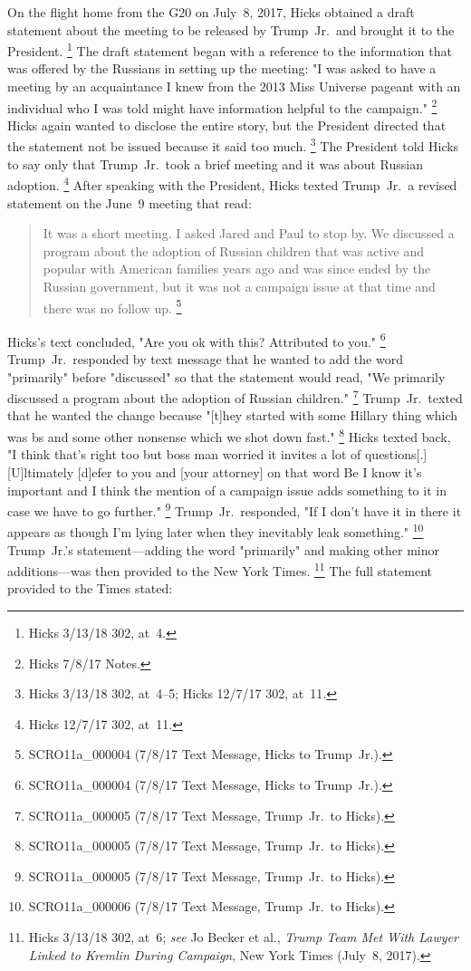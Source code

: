 On the flight home from the G20 on July~8, 2017, Hicks obtained a draft statement about the meeting to be released by Trump~Jr.\ and brought it to the President.%
\footnote{Hicks 3/13/18 302, at~4.}
The draft statement began with a reference to the information that was offered by the Russians in setting up the meeting: "I was asked to have a meeting by an acquaintance I knew from the 2013 Miss Universe pageant with an individual who I was told might have information helpful to the campaign."%
\footnote{Hicks 7/8/17 Notes.}
Hicks again wanted to disclose the entire story, but the President directed that the statement not be
issued because it said too much.%
\footnote{Hicks 3/13/18 302, at~4--5;
Hicks 12/7/17 302, at~11.}
The President told Hicks to say only that Trump~Jr.\ took a brief meeting and it was about Russian adoption.%
\footnote{Hicks 12/7/17 302, at~11.}
After speaking with the President, Hicks texted Trump~Jr.\ a revised statement on the June~9 meeting that read:

\begin{quote}
It was a short meeting.
I asked Jared and Paul to stop by.
We discussed a program about the adoption of Russian children that was active and popular with American families years ago and was since ended by the Russian government, but it was not a campaign issue at that time and there was no follow up.%
\footnote{SCRO11a\_000004 (7/8/17 Text Message, Hicks to Trump~Jr.).}
\end{quote}

Hicks's text concluded, "Are you ok with this? Attributed to you."%
\footnote{SCRO11a\_000004 (7/8/17 Text Message, Hicks to Trump~Jr.).}
Trump~Jr.\ responded by text message that he wanted to add the word "primarily" before "discussed" so that the statement would read, "We primarily discussed a program about the adoption of Russian children."%
\footnote{SCRO11a\_000005 (7/8/17 Text Message, Trump~Jr.\ to Hicks).}
Trump~Jr.\ texted that he wanted the change because "[t]hey started with some Hillary thing which was bs and some other nonsense which we shot down fast."%
\footnote{SCRO11a\_000005 (7/8/17 Text Message, Trump~Jr.\ to Hicks).}
Hicks texted back, "I think that's right too but boss man worried it invites a lot of questions[.]
[U]ltimately [d]efer to you and [your attorney] on that word Be I know it's important and I think the mention of a campaign issue adds something to it in case we have to go further."%
\footnote{SCRO11a\_000005 (7/8/17 Text Message, Trump~Jr.\ to Hicks).}
Trump~Jr.\ responded, "If I don't have it in there it appears as though I'm lying later when they inevitably leak something."%
\footnote{SCRO11a\_000006 (7/8/17 Text Message, Trump~Jr.\ to Hicks).}
Trump~Jr.'s statement---adding the word "primarily" and making other minor additions---was then provided to the New York Times.%
\footnote{Hicks 3/13/18 302, at~6;
\textit{see} Jo Becker et al., \textit{Trump Team Met With Lawyer Linked to Kremlin During Campaign}, New York Times (July~8, 2017).}
The full statement provided to the Times stated:

